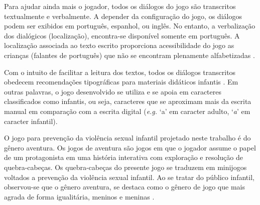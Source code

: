 
Para ajudar ainda mais o jogador, todos os diálogos do jogo são transcritos textualmente e verbalmente. A depender da configuração do jogo, os diálogos podem ser exibidos em português, espanhol, ou inglês. No entanto, a verbalização dos dialógicos (localização), encontra-se disponível somente em português. A localização associada ao texto escrito proporciona acessibilidade do jogo as crianças (falantes de português) que não se encontram plenamente alfabetizadas \cite{limeira2015avaliaccao}. 

Com o intuito de facilitar a leitura dos textos, todos os diálogos transcritos obedecem recomendações tipográficas para materiais didáticos infantis \cite{lourenco2011tipografia}. Em outras palavras, o jogo desenvolvido se utiliza e se apoia em caracteres classificados como infantis, ou seja, caracteres que se aproximam mais da escrita manual em comparação com a escrita digital (\textit{e.g.} `a' em caracter adulto, `\textit{a}' em caracter infantil).

O jogo para prevenção da violência sexual infantil projetado neste trabalho é do gênero aventura. Os jogos de aventura são jogos em que o jogador assume o papel de um protagonista em uma história interativa com exploração e resolução de quebra-cabeças. Os quebra-cabeças do presente jogo se traduzem em minijogos voltados a prevenção da violência sexual infantil. Ao se tratar do público infantil, observou-se que o gênero aventura, se destaca como o gênero de jogo que mais agrada de forma igualitária, meninos e meninas \cite{brandtzaeg2009children}. 

